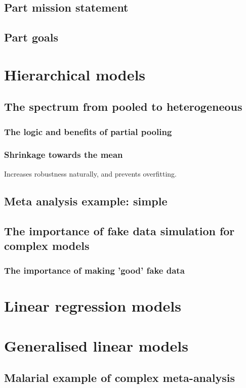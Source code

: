\documentclass[11pt,fullpage]{book}
\begin{document}
\section{Part mission statement}
\section{Part goals}

\chapter{Hierarchical models}\label{chap:hierarchicalModels}
\section{The spectrum from pooled to heterogeneous}
\subsection{The logic and benefits of partial pooling}
\subsection{Shrinkage towards the mean}
Increases robustness naturally, and prevents overfitting.

\section{Meta analysis example: simple}

\section{The importance of fake data simulation for complex models}
\subsection{The importance of making 'good' fake data}

\chapter{Linear regression models}
\chapter{Generalised linear models}
\section{Malarial example of complex meta-analysis}




\end{document}
